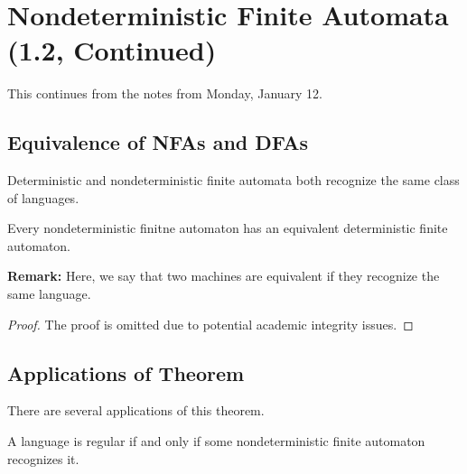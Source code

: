 \documentclass[letterpaper]{article}
\begin{document}
\section{Nondeterministic Finite Automata (1.2, Continued)}
This continues from the notes from Monday, January 12.

\subsection{Equivalence of NFAs and DFAs}
Deterministic and nondeterministic finite automata both recognize the same class of languages.

\begin{theorem}{}{}
    Every nondeterministic finitne automaton has an equivalent deterministic finite automaton.
\end{theorem}
\textbf{Remark:} Here, we say that two machines are equivalent if they recognize the same language. 

\begin{mdframed}[]
    \begin{proof}
        The proof is omitted due to potential academic integrity issues.
    \end{proof}
\end{mdframed}

\subsection{Applications of Theorem}
There are several applications of this theorem. 

\begin{corollary}{}{}
    A language is regular if and only if some nondeterministic finite automaton recognizes it.
\end{corollary}
\end{document}
